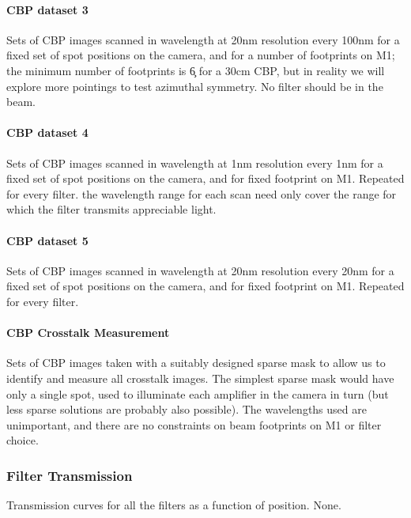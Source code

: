 	
\paragraph{CBP dataset 3}\label{sec:calibInputs:CBP:M1}
Sets of CBP images scanned in wavelength at 20nm resolution every 100nm for a fixed set of spot positions on the camera, and for a number of footprints on M1; the minimum number of footprints is \c 6 for a 30cm CBP, but in reality we will explore more pointings to test azimuthal symmetry. No filter should be in the beam.


\paragraph{CBP dataset 4}\label{sec:calibInputs:CBP:filter}
Sets of CBP images scanned in wavelength at 1nm resolution every 1nm for a fixed set of spot positions on the camera, and for fixed footprint on M1. Repeated for every filter. \Nb the wavelength range for each scan need only cover the range for which the filter transmits appreciable light.


\paragraph{CBP dataset 5}\label{sec:calibInputs:CBP:leak}
Sets of CBP images scanned in wavelength at 20nm resolution every 20nm for a fixed set of spot positions on the camera, and for fixed footprint on M1. Repeated for every filter.


\paragraph {CBP Crosstalk Measurement}\label{sec:calibInputs:CBP:crosstalk}
Sets of CBP images taken with a suitably designed sparse mask to allow us to identify and measure all crosstalk images. The simplest sparse mask would have only a single spot, used to illuminate each amplifier in the camera in turn (but less sparse solutions are probably also possible). The wavelengths used are unimportant, and there are no constraints on beam footprints on M1 or filter choice.


\subsubsection{Filter Transmission}\label{sec:calibInputs:filterTransmission}
\cameraTeam
Transmission curves for all the filters as a function of position.
\alg None.


